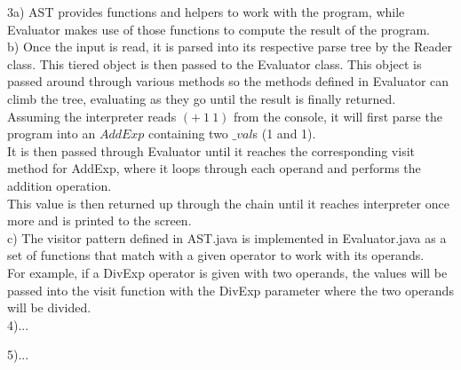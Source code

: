 \documentclass[12pt]{article}
\begin{document}
\noindent 3a) AST provides functions and helpers to work with the program, while Evaluator makes use of those functions to compute the result of the program. \\

\noindent b) Once the input is read, it is parsed into its respective parse tree by the Reader class. This tiered object is then passed to the Evaluator class. This object is passed around through various methods so the methods defined in Evaluator can climb the tree, evaluating as they go until the result is finally returned.\\
Assuming the interpreter reads $(+\ 1\  1)$ from the console, it will first parse the program into an $\textit{AddExp}$ containing two $\textit{\_val}$s (1 and 1).\\ 
It is then passed through Evaluator until it reaches the corresponding visit method for AddExp, where it loops through each operand and performs the addition operation.\\ 
This value is then returned up through the chain until it reaches interpreter once more and is printed to the screen.\\

c) The visitor pattern defined in AST.java is implemented in Evaluator.java as a set of functions that match with a given operator to work with its operands.\\ 
For example, if a DivExp operator is given with two operands, the values will be passed into the visit function with the DivExp parameter where the two operands will be divided.\\


4)...

5)...

\end{document}
